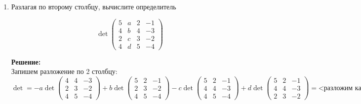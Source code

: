 \documentclass[a4paper,12pt]{article}
\begin{document}
\begin{enumerate}
$=(\lambda-1)((\lambda-1)(\lambda-4)-8)+5(2(\lambda-4)+6)=(\lambda-1)(\lambda^2+4-5\lambda-8)+5(2\lambda-8+6)=(\lambda-1)(\lambda^2-5\lambda-4)+10(\lambda-1)=(\lambda-1)(\lambda^2-5\lambda-4+10)=(\lambda-1)(\lambda^2-5\lambda+6)=(\lambda-1)(\lambda-2)(\lambda-3)$

Спектр - решения характеристического многочлена равного 0.

$$(\lambda-1)(\lambda-2)(\lambda-3)=0 \Rightarrow \begin{cases}
    \lambda = 1\\
    \lambda = 2\\
    \lambda = 3
\end{cases}$$

\textbf{Ответ: Характеристический многочлен: $(\lambda-1)(\lambda-2)(\lambda-3)$ и спектр $\begin{cases}
    \lambda = 1\\
    \lambda = 2\\
    \lambda = 3
\end{cases}$}


\item Разлагая по второму столбцу, вычислите определитель

$$
\det\begin{pmatrix}
5&a&2&-1\\
4&b&4&-3\\
2&c&3&-2\\
4&d&5&-4
\end{pmatrix}
$$


\vspace{5pt}
\textbf{Решение:}\\
Запишем разложение по 2 столбцу:
$\det = -a \det \begin{pmatrix}
4&4&-3\\
2&3&-2\\
4&5&-4
\end{pmatrix}+b \det \begin{pmatrix}
5&2&-1\\
2&3&-2\\
4&5&-4
\end{pmatrix} - c \det \begin{pmatrix}
5&2&-1\\
4&4&-3\\
4&5&-4
\end{pmatrix}+ d \det \begin{pmatrix}
5&2&-1\\
4&4&-3\\
2&3&-2
\end{pmatrix}=\text{<разложим каждый определитель по 1 столбцу>}=-a(4*(-12+10)-2*(-16+15)+4(-8+9))+b(5*(-12+10)-2*(-8+5)+4*(-4+3))-c(5*(-16+15)-4*(-8+5)+4*(-6+4))+d(5*(-8+9)-4*(-4+3)+2*(-6+4))=2a-8b+1c+5d$


\end{enumerate}
\end{document}
